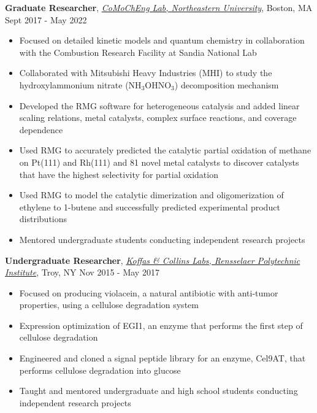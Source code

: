 \documentclass[10pt, line]{res}
\begin{document}
\begin{resume}
\textbf{Graduate Researcher}, \href{http://www.northeastern.edu/comocheng/people/}{\sl CoMoChEng Lab, Northeastern University}, Boston, MA \hspace{0.2in}  \hfill Sept 2017 - May 2022
\begin{itemize}
    \item Focused on detailed kinetic models and quantum chemistry in collaboration with the Combustion Research Facility at Sandia National Lab
    \item Collaborated with Mitsubishi Heavy Industries (MHI) to study the hydroxylammonium nitrate (NH$_3$OHNO$_3$) decomposition mechanism
    \item Developed the RMG software for heterogeneous catalysis and added linear scaling relations, metal catalysts, complex surface reactions, and coverage dependence
    \item Used RMG to accurately predicted the catalytic partial oxidation of methane on Pt(111) and Rh(111) and 81 novel metal catalysts to discover catalysts that have the highest selectivity for partial oxidation 
    \item Used RMG to model the catalytic dimerization and oligomerization of ethylene to 1-butene and successfully predicted experimental product distributions
	\item Mentored undergraduate students conducting independent research projects
\end{itemize}
\vspace{-5pt}

\textbf{Undergraduate Researcher}, \href{https://homepages.rpi.edu/~koffam/}{\sl Koffas \& Collins Labs, Rensselaer Polytechnic Institute}, Troy, NY  \hfill Nov 2015 - May 2017
\begin{itemize}
    \item Focused on producing violacein, a natural antibiotic with anti-tumor properties, using a cellulose degradation system
    \item Expression optimization of  EGI1, an enzyme that performs the first step of cellulose degradation
    \item Engineered and cloned a signal peptide library for an enzyme, Cel9AT, that performs cellulose degradation into glucose
    \item Taught and mentored undergraduate and high school students conducting independent research projects
\end{itemize}
\vspace{-5pt}


\end{resume}
\end{document}
